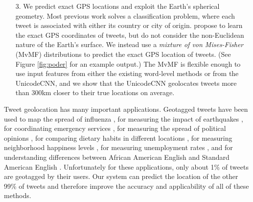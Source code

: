 \documentclass[sigconf,anonymous,review]{acmart}
\newcommand{\defn}[1]{\textit{#1}}
\newcommand{\fixme}[1]{\textcolor{red}{\textbf{FIXME:} {#1}}}
\begin{document}
\begin{enumerate}
\item[3.]
    We predict exact GPS locations and exploit the Earth's spherical geometry.
Most previous work solves a classification problem,
where each tweet is associated with either its country or city of origin.
\citet{duong2016near} propose to learn the exact GPS coordinates of tweets,
but do not consider the non-Euclidean nature of the Earth's surface.
We instead use a \defn{mixture of von Mises-Fisher} (MvMF) distributions to predict the exact GPS location of tweets.
(See Figure \ref{fig:poder} for an example output.)
The MvMF is flexible enough to use input features from either the existing word-level methods or from the UnicodeCNN,
and we show that the UnicodeCNN geolocates tweets more than 300km closer to their true locations on average.
\end{enumerate}


Tweet geolocation has many important applications.
Geotagged tweets have been used to map the spread of influenza \citep{paul2014twitter,santillana2015combining},
for measuring the impact of earthquakes \citep{sakaki2010earthquake},
for coordinating emergency services \citep{klein2012detection,rudra2016summarizing,imran2016twitter,pohl2016online},
for measuring the spread of political opinions \citep{conover2011political,barbera2014birds},
for comparing dietary habits in different locations \citep{widener2014using},
for measuring neighborhood happiness levels \citep{nguyen2016leveraging}, 
for measuring unemployment rates \citep{antenucci2014using,llorente2015social},
and for understanding differences between African American English and Standard American English \citep{huang2016understanding,gonccalves2017fall,blodgett2016demographic}. %
Unfortunately for these applications, only about 1\% of tweets are geotagged by their users.
Our system can predict the location of the other 99\% of tweets and therefore improve the accuracy and applicability of all of these methods.
\end{document}
